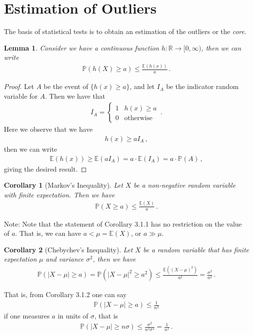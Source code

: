 \documentclass[11pt, onesided]{book}
\theoremstyle{break}
\theoremstyle{break}
\newtheorem{lem}{Lemma}[thm]
\newtheorem{cor}{Corollary}[thm]
\newcommand{\R}{\mathbb{R}}
\newcommand{\note}{\color{red}Note: \color{black}}
\begin{document}
\section[Estimation of Outliers]{\color{red} Estimation of Outliers\color{black}}
The basis of statistical tests is to obtain an estimation of the outliers or the \textit{core}. 

\begin{lem}
Consider we have a continuous function $h:\R \to [0,\infty)$, then we can write
\begin{align*}
\mathbb{P}(h(X) \geq a) \leq \frac{\mathbb{E}(h(x))}{a}\,.
\end{align*}
\end{lem}
\begin{proof}
Let $A$ be the event of $\{h(x) \geq a\}$, and let $I_A$ be the indicator random variable for $A$. Then we have that 
\begin{align*}
I_A = \begin{cases}
1 & h(x)\geq a\\
0 & \text{otherwise}
\end{cases}\,.
\end{align*}
Here we observe that we have
\begin{align*}
h(x) \geq a I_A\,,
\end{align*}
then we can write
\begin{align*}
\mathbb{E}(h(x)) \geq \mathbb{E}(aI_A) = a\cdot \mathbb{E}(I_A) = a \cdot \mathbb{P}(A) \,,
\end{align*}
giving the desired result. 
\end{proof}

\begin{cor}[Markov's Inequality]
Let $X$ be a non-negative random variable with finite expectation. Then we have
\begin{align*}
\mathbb{P}(X\geq a) \leq \frac{\mathbb{E}(X)}{a}\,.
\end{align*}
\end{cor}
\note Note that the statement of Corollary 3.1.1 has no restriction on the value of $a$. That is, we can have $a< \mu = \mathbb{E}(X)$, or $a \gg \mu $.\\

\begin{cor}[Chebychev's Inequality]
Let $X$ be a random variable that has finite expectation $\mu$ and variance $\sigma^2$, then we have
\begin{align*}
\mathbb{P}(|X-\mu| \geq a) = \mathbb{P}(|X-\mu|^2 \geq a^2) \leq \frac{\mathbb{E}((X-\mu)^2)}{a^2}= \frac{\sigma^2}{a^2}\,.
\end{align*}
\end{cor}
That is, from Corollary 3.1.2 one can say
\begin{align*}
\mathbb{P}(|X-\mu| \geq a) \leq \frac{1}{n^2}
\end{align*}
if one measures $a$ in units of $\sigma$, that is
\begin{align*}
\mathbb{P}(|X-\mu| \geq n \sigma) \leq \frac{\sigma^2}{n^2 \sigma^2} = \frac{1}{n^2}\,.
\end{align*}
\end{document}
